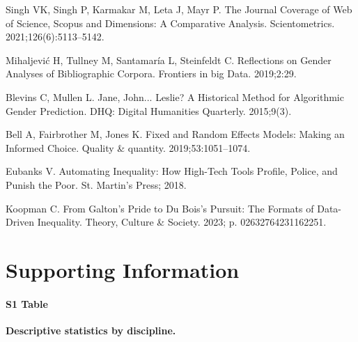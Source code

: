 \documentclass[
  10pt,
  letterpaper,
]{article}
\begin{document}
\begin{thebibliography}{10}
Singh VK, Singh P, Karmakar M, Leta J, Mayr P.
\newblock The Journal Coverage of {{Web}} of {{Science}}, {{Scopus}} and {{Dimensions}}: {{A}} Comparative Analysis.
\newblock Scientometrics. 2021;126(6):5113--5142.

Mihaljevi{\'c} H, Tullney M, Santamar{\'i}a L, Steinfeldt C.
\newblock Reflections on Gender Analyses of Bibliographic Corpora.
\newblock Frontiers in big Data. 2019;2:29.

Blevins C, Mullen L.
\newblock Jane, {{John}}... {{Leslie}}? {{A Historical Method}} for {{Algorithmic Gender Prediction}}.
\newblock DHQ: Digital Humanities Quarterly. 2015;9(3).

Bell A, Fairbrother M, Jones K.
\newblock Fixed and Random Effects Models: Making an Informed Choice.
\newblock Quality \& quantity. 2019;53:1051--1074.

Eubanks V.
\newblock Automating Inequality: {{How}} High-Tech Tools Profile, Police, and Punish the Poor.
\newblock St. Martin's Press; 2018.

Koopman C.
\newblock From {{Galton}}'s {{Pride}} to {{Du Bois}}'s {{Pursuit}}: {{The Formats}} of {{Data-Driven Inequality}}.
\newblock Theory, Culture \& Society. 2023; p. 02632764231162251.

\end{thebibliography}


\section{Supporting Information}\label{supporting-information}

\paragraph*{S1 Table}
\label{id}
{\textbf{Descriptive statistics by discipline.}}


\nolinenumbers
\end{document}
